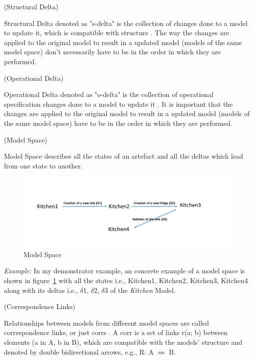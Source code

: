 \begin{defn}\label{defStructuralDelta } (Structural Delta) \end{defn}
Structural Delta denoted as "s-delta" is the collection of changes done to a model to update it, which is compatible with structure \cite{benchmarx-reload}. The way the changes are applied to the original model to result in a updated model (models of the same model space) don't necessarily have to be in the order in which they are performed.\\

\begin{defn}\label{defOperationalDelta } (Operational Delta) \end{defn}
Operational Delta denoted as "o-delta" is the collection of operational specification changes done to a model to update it \cite{benchmarx-reload}. It is important that the changes are applied to the original model to result in a updated model (models of the same model space) have to be in the order in which they are performed.\\ 

\begin{defn}\label{defModelSpace } (Model Space) \end{defn}
Model Space describes all the states of an artefact and all the deltas which lead from one state to another.
\begin{figure}
	\includegraphics[width=1\textwidth]{figures/Model_Space}
	\caption{Model Space}
	\label{fig:Model_Space}
\end{figure}

\textit{Example:} In my demonstrator example, an concrete example of a model space is shown in figure~\ref{fig:Model_Space} with all the states i.e., Kitchen1, Kitchen2, Kitchen3, Kitchen4 along with its deltas i.e., $\delta$1, $\delta$2, $\delta$3 of the \textit{Kitchen} Model.\\

\begin{defn}\label{defCorrespondenceLinks } (Correspondence Links) \end{defn}
Relationships between models from different model spaces are called correspondence links, or just corrs \cite{benchmarx-reload}. A corr is a set of links  r(a; b) between elements (a in A, b in B), which are compatible with the models' structure and denoted by double bidirectional arrows, e.g., R: A $\Longleftrightarrow$ B. 

